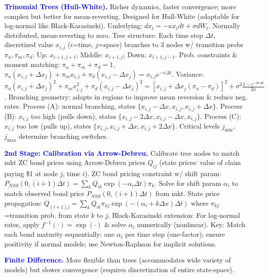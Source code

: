 \documentclass[landscape]{article}
\begin{document}
\begin{multicols}{4}
\textcolor{blue}{\textbf{Trinomial Trees (Hull-White).}} Richer dynamics, faster convergence; more complex but better for mean-reverting. Designed for Hull-White (adaptable for log-normal like Black-Karasinski). Underlying: $dx_t=-\kappa x_t dt+\sigma dW_t$. Normally distributed, mean-reverting to zero. Tree structure: Each time step $\Delta t$, discretized value $x_{i,j}$ ($i$=time, $j$=space) branches to 3 nodes w/ transition probs $\pi_u,\pi_m,\pi_d$: Up: $x_{i+1,j+1}$; Middle: $x_{i+1,j}$; Down: $x_{i+1,j-1}$. Prob. constraints \& moment matching: $\pi_u+\pi_m+\pi_d=1$, $\pi_u(x_{i,j}+\Delta x_j)+\pi_m x_{i,j}+\pi_d(x_{i,j}-\Delta x_j)=x_{i,j}e^{-\kappa\Delta t}$. Variance: $\pi_u(x_{i,j}+\Delta x_j)^2+\pi_m x_{i,j}^2+\pi_d(x_{i,j}-\Delta x_j)^2=[x_{i,j}+\Delta x_j(\pi_u-\pi_d)]^2+\sigma^2\frac{1-e^{-2\kappa\Delta t}}{2\kappa}$. Branching geometry: adapts in regions to improve mean reversion \& reduce neg. rates. Process (A): normal branching, states $\{x_{i,j}-\Delta x,x_{i,j},x_{i,j}+\Delta x\}$. Process (B): $x_{i,j}$ too high (pulls down), states $\{x_{i,j}-2\Delta x,x_{i,j}-\Delta x,x_{i,j}\}$. Process (C): $x_{i,j}$ too low (pulls up), states $\{x_{i,j},x_{i,j}+\Delta x,x_{i,j}+2\Delta x\}$. Critical levels $j_{\min}$, $j_{\max}$ determine branching switches.

\textcolor{blue}{\textbf{2nd Stage: Calibration via Arrow-Debreu.}} Calibrate tree nodes to match mkt ZC bond prices using Arrow-Debreu prices $Q_{ij}$ (state prices: value of claim paying \$1 at node $j$, time $i$). ZC bond pricing constraint w/ shift param: $P_{NSS}(0,(i+1)\Delta t)=\sum_k Q_{ik}\exp(-\alpha_i\Delta t)\pi_k$. Solve for shift param $\alpha_i$ to match observed bond price $P_{NSS}(0,(i+1)\Delta t)$ from mkt. State price propagation: $Q_{(i+1)j}=\sum_k Q_{ik}\pi_{kj}\exp(-(\alpha_i+k\Delta x)\Delta t)$ where $\pi_{kj}$=transition prob. from state $k$ to $j$. Black-Karasinski extension: For log-normal rates, apply $f^{-1}(\cdot)=\exp(\cdot)$ \& solve $\alpha_i$ numerically (nonlinear). Key: Match each bond maturity sequentially; one $\alpha_i$ per time step (one-factor); ensure positivity if normal models; use Newton-Raphson for implicit solutions.

\textcolor{blue}{\textbf{Finite Difference.}} More flexible than trees (accommodates wide variety of models) but slower convergence (requires discretization of entire state-space).


\end{multicols}
\end{document}
